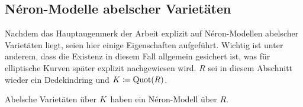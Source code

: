\subsection{Néron-Modelle abelscher Varietäten}
Nachdem das Hauptaugenmerk der Arbeit explizit auf Néron-Modellen
abelscher Varietäten liegt, seien hier einige Eigenschaften aufgeführt.
Wichtig ist unter anderem, dass die Existenz in diesem Fall allgemein
gesichert ist, was für elliptische Kurven später explizit nachgewiesen
wird.
$R$ sei in diesem Abschnitt wieder ein Dedekindring und
$K\coloneqq\operatorname{Quot}(R)$.
\begin{Satz}\label{thm:exneronmodellabvarietaet}
  Abelsche Varietäten über $K$ haben ein Néron-Modell über $R$.
\end{Satz}


